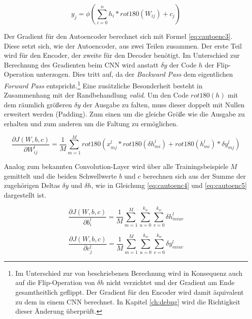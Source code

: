 \begin{equation}
\label{eq:cautoenc2} 
y_j = \phi(\sum_{i=0}^{n} h_{i} \ast rot180(W_{ij}) + c_j)
\end{equation}

Der Gradient für den Autoencoder berechnet sich mit Formel \ref{eq:cautoenc3}. Diese setzt sich, wie der Autoencoder, aus zwei Teilen zusammen. Der erste Teil wird für den Encoder, der zweite für den Decoder benötigt. Im Unterschied zur Berechnung des Gradienten beim CNN wird anstatt $\delta y$ der Code $h$ der Flip-Operation unterzogen. Dies tritt auf, da der \textit{Backward Pass} dem eigentlichen \textit{Forward Pass} entspricht.\footnote{Im Unterschied zur von \cite{Masci2011} beschriebenen Berechnung wird in Konsequenz auch auf die Flip-Operation von $\delta h$ nicht verzichtet und der Gradient am Ende gesamtheitlich geflippt. Der Gradient für den Encoder wird damit äquivalent zu dem in einem CNN berechnet. In Kapitel \ref{ch:debug} wird die Richtigkeit dieser Änderung überprüft.}
Eine zusätzliche Besonderheit besteht in Zusammenhang mit der Randbehandlung \textit{valid}. Um den Code $rot180(h)$ mit dem räumlich größeren $\delta y$ der Ausgabe zu falten, muss dieser doppelt mit Nullen erweitert werden (Padding). Zum einen um die gleiche Größe wie die Ausgabe zu erhalten und zum anderen um die Faltung zu ermöglichen.

\begin{equation}
\label{eq:cautoenc3} 
\frac{\partial J(W,b,c)}{\partial W_{ij}^l} = \frac{1}{M} \sum_{m=1}^{M} rot180(x_{mj}^l \ast  rot180(\delta h_{mi}^l) + rot180(h_{mi}^l) \ast \delta y_{mj}^l)   
\end{equation}

Analog zum bekannten Convolution-Layer wird über alle Trainingsbeispiele $M$ gemittelt und die beiden Schwellwerte $b$ und $c$ berechnen sich aus der Summe der zugehörigen Deltas $\delta y$ und $\delta h$, wie in Gleichung \ref{eq:cautoenc4} und \ref{eq:cautoenc5} dargestellt ist.

\begin{equation}
\label{eq:cautoenc4} 
\frac{\partial J(W,b,c)}{\partial b_{i}^l} = \frac{1}{M} \sum_{m=1}^{M} \sum_{u=0}^{k_w} \sum_{v=0}^{k_w} \delta h_{miuv}^{l} 
\end{equation}


\begin{equation}
\label{eq:cautoenc5} 
\frac{\partial J(W,b,c)}{\partial c_{j}^l} = \frac{1}{M} \sum_{m=1}^{M} \sum_{u=0}^{k_w} \sum_{v=0}^{k_w} \delta y_{miuv}^{l} 
\end{equation}


